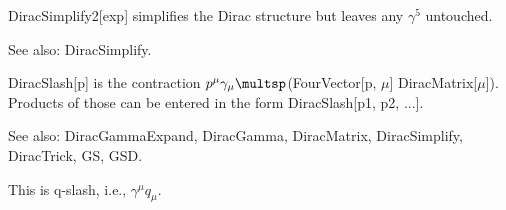 DiracSimplify2[exp] simplifies the Dirac structure but leaves any \({{\gamma }^5}\) untouched.

See also:  DiracSimplify.








DiracSlash[p] is the contraction \({p^{\mu }}{{\gamma }_{\mu }}\multsp \)(FourVector[p, \(\mu \)] DiracMatrix[\(\mu \)]). Products of those can be
entered in the form DiracSlash[p1, p2, ...].



See also:  DiracGammaExpand, DiracGamma, DiracMatrix, DiracSimplify, DiracTrick, GS, GSD.


This is q-slash, i.e., \({{\gamma }^{\mu }}{q_{\mu }}.\)










